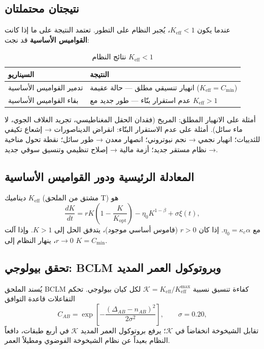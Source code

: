 \documentclass[12pt,a4paper]{article}
\newcommand{\Keff}{K_{\mathrm{eff}}}
\newcommand{\REL}{\mathcal{K}}
\begin{document}
	\subsection{نتيجتان محتملتان}
	عندما يكون \(\Keff < 1\)، يُجبر النظام على التطور. تعتمد النتيجة على ما إذا كانت \textbf{القواميس الأساسية} قد نجت:
	
	\begin{table}[H]
		\centering
		\caption{نتائج النظام \(\Keff < 1\)}
		\begin{tabular}{p{5cm}p{8cm}}
			\toprule
			\textbf{السيناريو} & \textbf{النتيجة} \\
			\midrule
			تدمير القواميس الأساسية & انهيار تنسيقي مطلق — حالة عقيمة (\(\Keff = C_{\min}\)) \\
			بقاء القواميس الأساسية & عدم استقرار بنّاء — طور جديد مع \(\Keff > 1\) \\
			\bottomrule
		\end{tabular}
	\end{table}
	
	أمثلة على الانهيار المطلق: المريخ (فقدان الحقل المغناطيسي، تجريد الغلاف الجوي، لا ماء سائل). أمثلة على عدم الاستقرار البنّاء: انقراض الديناصورات → إشعاع تكيفي للثدييات؛ انهيار نجمي → نجم نيوتروني؛ انصهار معدن → طور سائل؛ نقطة تحول مناخية → نظام مستقر جديد؛ أزمة مالية → إصلاح تنظيمي وتنسيق سوقي جديد.
	
	\subsection{المعادلة الرئيسية ودور القواميس الأساسية}
	ديناميك \(\Keff\) (مشتق من الملحق T) هو
	\begin{equation}
		\frac{dK}{dt} = r K\left(1 - \frac{K}{K_{\mathrm{opt}}}\right) - \eta_0 K^{1-\beta} + \sigma \xi(t),
		\label{eq:master}
	\end{equation}
	مع \(\eta_0 = \kappa_c \alpha\). إذا كان \(r > 0\) (قاموس أساسي موجود)، يتدفق الحل إلى \(K > 1\). وإذا آلت \(r \to 0\)، ينهار النظام إلى \(K = C_{\min}\).
	
	\subsection{تحقق بيولوجي: BCLM وبروتوكول العمر المديد}
	يُسند الملحق BCLM كفاءة تنسيق نسبية \(\REL = \Keff/\Keff^{\max}\) لكل كيان بيولوجي. تحكم التفاعلات قاعدة التوافق
	\[
	C_{AB} = \exp\!\left[-\frac{(\Delta_{AB} - n_{AB})^2}{2\sigma^2}\right],\qquad \sigma = 0.20,
	\]
	تقابل الشيخوخة انخفاضاً في \(\REL\)؛ يرفع بروتوكول العمر المديد \(\REL\) في أربع طبقات، دافعاً النظام بعيداً عن نظام الشيخوخة الفوضوي ومطيلاً العمر.
	
\end{document}
